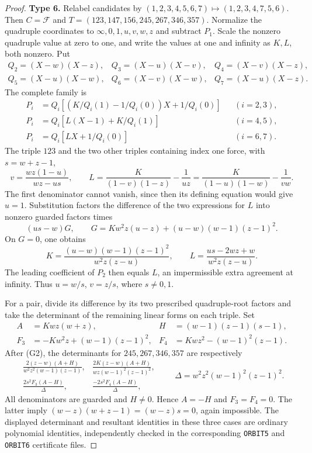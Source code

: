 \begin{proof}
\smallskip\noindent\textbf{Type 6.}
Relabel candidates by $(1,2,3,4,5,6,7)\mapsto(1,2,3,4,7,5,6)$.
Then $C=\mathcal F$ and
$T=(123,147,156,245,267,346,357)$.
Normalize the quadruple coordinates to $\infty,0,1,u,v,w,z$ and
subtract $P_1$.  Scale the nonzero quadruple value at zero to one, and
write the values at one and infinity as $K,L$, both nonzero.  Put
\[
\begin{array}{lll}
 Q_2=(X-w)(X-z),&Q_3=(X-u)(X-v),&Q_4=(X-v)(X-z),\\
 Q_5=(X-u)(X-w),&Q_6=(X-v)(X-w),&Q_7=(X-u)(X-z).
\end{array}
\]
The complete family is
\begin{align*}
 P_i&=Q_i[(K/Q_i(1)-1/Q_i(0))X+1/Q_i(0)] &&(i=2,3),\\
 P_i&=Q_i[L(X-1)+K/Q_i(1)] &&(i=4,5),\\
 P_i&=Q_i[LX+1/Q_i(0)] &&(i=6,7).
\end{align*}
The triple $123$ and the two other triples containing index one force,
with $s=w+z-1$,
\[
 v=\frac{wz(1-u)}{wz-us},\qquad
 L=\frac{K}{(1-v)(1-z)}-\frac1{uz}
  =\frac{K}{(1-u)(1-w)}-\frac1{vw}.             \tag{G2}
\]
The first denominator cannot vanish, since then its defining equation
would give $u=1$.  Substitution factors the difference of the two
expressions for $L$ into nonzero guarded factors times
\[
 (us-w)G,\qquad G=Kw^2z(u-z)+(u-w)(w-1)(z-1)^2.
\]
On $G=0$, one obtains
\[
 K=\frac{(u-w)(w-1)(z-1)^2}{w^2z(z-u)},\qquad
 L=\frac{us-2wz+w}{w^2z(z-u)}.
\]
The leading coefficient of $P_2$ then equals $L$, an impermissible
extra agreement at infinity.  Thus $u=w/s$, $v=z/s$, where $s\ne0,1$.

For a pair, divide its difference by its two prescribed quadruple-root
factors and take the determinant of the remaining linear forms on each
triple.  Set
\begin{align*}
 A&=Kwz(w+z),& H&=(w-1)(z-1)(s-1),\\
 F_3&=-Kw^2z+(w-1)(z-1)^2,& F_4&=Kwz^2-(w-1)^2(z-1).
\end{align*}
After (G2), the determinants for $245,267,346,357$ are respectively
\[
\begin{array}{cc}
 \displaystyle\frac{2(z-w)(A+H)}{w^2z^2(w-1)(z-1)},&
 \displaystyle\frac{2K(z-w)(A+H)}{wz(w-1)^2(z-1)^2},\\[1ex]
 \displaystyle\frac{2s^2F_3(A-H)}{\Delta},&
 \displaystyle\frac{-2s^2F_4(A-H)}{\Delta},
\end{array}
\qquad \Delta=w^2z^2(w-1)^2(z-1)^2.
\]
All denominators are guarded and $H\ne0$.  Hence $A=-H$ and
$F_3=F_4=0$.  The latter imply $(w-z)(w+z-1)=(w-z)s=0$, again impossible.
The displayed determinant and resultant identities in these three cases
are ordinary polynomial identities, independently checked in the
corresponding \texttt{ORBIT5} and \texttt{ORBIT6} certificate files.


\end{proof}
